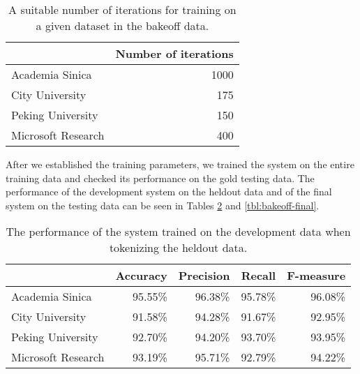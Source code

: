 \begin{table}
  \begin{center}
    \begin{tabular}{ | l | r | }
      \hline
      & Number of iterations \\ \hline
      Academia Sinica & 1000 \\ \hline
      City University & 175 \\ \hline
      Peking University & 150 \\ \hline
      Microsoft Research & 400 \\
      \hline
    \end{tabular}
  \end{center}
  \caption[Recommended iterations for Chinese segmentation]{A suitable number of iterations for training on a given dataset in
           the bakeoff data.}
  \label{tbl:bakeoff-iters}
\end{table}

After we established the training parameters, we trained the system on the
entire training data and checked its performance on the gold testing data. The
performance of the development system on the heldout data and of the final
system on the testing data can be seen in Tables \ref{tbl:bakeoff-devel} and
\ref{tbl:bakeoff-final}.

\begin{table}
  \begin{center}
    \begin{tabular}{ | l | r | r | r | r | }
      \hline
      & Accuracy & Precision & Recall & F-measure \\ \hline
      Academia Sinica & 95.55\% & 96.38\% & 95.78\% & 96.08\% \\ \hline
      City University & 91.58\% & 94.28\% & 91.67\% & 92.95\% \\ \hline
      Peking University & 92.70\% & 94.20\% & 93.70\% & 93.95\% \\ \hline
      Microsoft Research & 93.19\% & 95.71\% & 92.79\% & 94.22\% \\
      \hline
    \end{tabular}
  \end{center}
  \caption[Development performance of Chinese segmenter]{The performance of the system trained on the development data when
           tokenizing the heldout data.}
  \label{tbl:bakeoff-devel}
\end{table}

